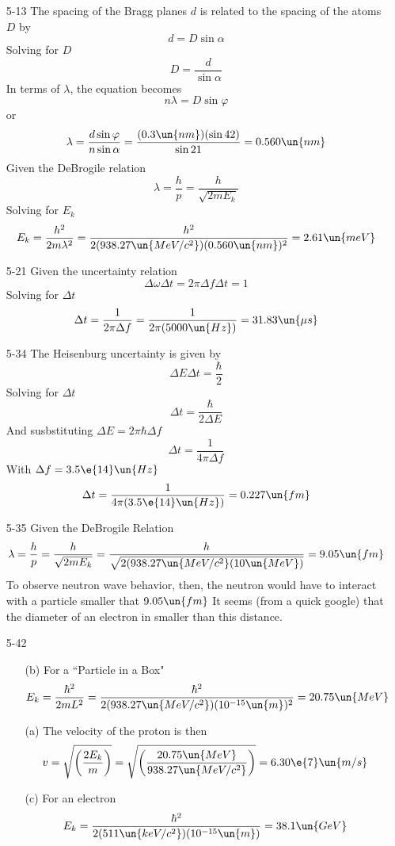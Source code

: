 \documentclass[]{2620hw}
\begin{document}
\maketitle
\begin{enumerate}

\item [5-13]
	The spacing of the Bragg planes $d$ is related to the spacing of the atoms $D$ by
	\[
		d = D \sin{\alpha}
	\]
	Solving for $D$
	\[
		D = \frac{d}{\sin{\alpha}}
	\]
	In terms of $\lambda$, the equation becomes
	\[
		n\lambda = D \sin{\varphi}
	\] 
	or
	\[
		 \lambda = \frac{d\sin{\varphi}}{n \sin{\alpha}} =   \frac{(0.3\un{nm}) (\sin{42})}{\sin{21}} = 0.560 \un{nm}
	\]
	Given the DeBrogile relation 
	\[
		\lambda = \frac{h}{p} =  \frac{h}{\sqrt{ 2mE_k }}
	\]
	Solving for $E_k$
	\[
		E_k = \frac{h^2}{2m\lambda^2} = \frac{h^2}{2(938.27 \un{MeV/c^2})(0.560\un{nm})^2} = 2.61 \un{meV}	
	\]

\item [5-21]
	Given the uncertainty relation
	\[
		\Delta \omega \Delta t = 2\pi \Delta f \Delta t = 1
	\]
	Solving for $\Delta t$
	\[
		\Delta t = \frac{1}{2\pi \Delta f} = \frac{1}{2\pi (5000 \un{Hz})} = 31.83 \un{\mu s}
	\]

\item [5-34]
	The Heisenburg uncertainty is given by 
	\[
		\Delta E \Delta t = \frac{\hbar}{2}
	\]
	Solving for $\Delta t$
	\[
		\Delta t = \frac{\hbar}{2 \Delta E}
	\]
	And susbstituting $\Delta E = 2\pi\hbar \Delta f$
	\[
		\Delta t = \frac{1}{4\pi \Delta f}
	\]
	With $\Delta f = 3.5 \e{14}\un{Hz}$
	\[
			\Delta t = \frac{1}{4\pi ( 3.5 \e{14}\un{Hz})} = 0.227 \un{fm}
	\]

\item [5-35]
	Given the DeBrogile Relation
	\[
		\lambda = \frac{h}{p} = \frac{h}{\sqrt {2mE_k}} = \frac{h}{\sqrt{2(938.27\un{MeV/c^2}(10\un{MeV})}} = 9.05 \un{fm}
	\]
	To observe neutron wave behavior, then, the neutron would have to interact with a particle smaller that $9.05 \un{fm}$ It seems (from a quick google) that the diameter of an electron in smaller than this distance. 

\item [5-42]
\begin{enumerate}
	\item [(b)] For a ``Particle in a Box"
	\[
		E_k = \frac{\hbar^2}{2mL^2} = \frac{\hbar^2}{2(938.27 \un{MeV/c^2})(10^{-15}\un{m})^2} = 20.75 \un{MeV}
	\]
	\item [(a)]
	The velocity of the proton is then
	\[
		v = \sqrt{ \left(\frac{2E_k}{m}\right) } = \sqrt{ \left(\frac{20.75 \un{MeV}}{938.27 \un{MeV/c^2}}\right)} = 6.30\e{7}\un{m/s}
	\]
	\item [(c)] For an electron
	\[
		E_k = \frac{\hbar^2}{2(511\un{keV/c^2})(10^{-15}\un{m})} = 38.1 \un{GeV}
	\]
\end{enumerate}


\end{enumerate}
\end{document}
